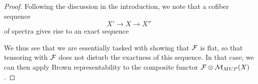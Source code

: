 \begin{proof}
Following the discussion in the introduction, we note that a cofiber sequence \[X' \to X \to X''\] of spectra gives rise to an exact sequence
\begin{center}
\end{center}
We thus see that we are essentially tasked with showing that \(\mathcal{F}\) is flat, so that tensoring with \(\mathcal{F}\) does not disturb the exactness of this sequence.  In that case, we can then apply Brown representability to the composite functor \(\mathcal{F} \otimes \mathcal{M}_{MUP}(X)\).


\end{proof}
